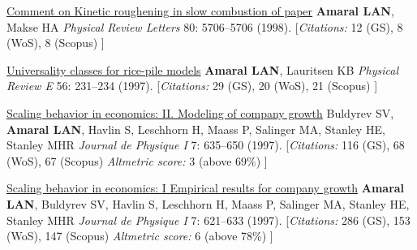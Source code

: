 \NumberedItem{\makebox[0.8cm][r]{[15]}}
\href{/people/amaral/comment-on-kinetic-roughening-in-slow-combustion-of-paper}
{Comment on Kinetic roughening in slow combustion of paper}
\newline
{\textbf{Amaral LAN}}, Makse HA
\newline
\textit{Physical Review Letters}
    80:
5706--5706 (1998).
    \newline
    \hfill [{\em{Citations:}} 12 (GS),
    8 (WoS), 8 (Scopus)
    ]
\newline
\Gap
~
\Gap

\NumberedItem{\makebox[0.8cm][r]{[14]}}
\href{/people/amaral/universality-classes-for-rice-pile-models}
{Universality classes for rice-pile models}
\newline
{\textbf{Amaral LAN}}, Lauritsen KB
\newline
\textit{Physical Review E}
    56:
231--234 (1997).
    \newline
    \hfill [{\em{Citations:}} 29 (GS),
    20 (WoS), 21 (Scopus)
    ]
\newline
\Gap
~
\Gap

\NumberedItem{\makebox[0.8cm][r]{[13]}}
\href{/people/amaral/scaling-behavior-in-economics-2-modeling-of-company-growth}
{Scaling behavior in economics: II. Modeling of company growth}
\newline
Buldyrev SV, {\textbf{Amaral LAN}}, Havlin S, Leschhorn H, Maass P, Salinger MA, Stanley HE, Stanley MHR
\newline
\textit{Journal de Physique I}
    7:
635--650 (1997).
    \newline
    \hfill [{\em{Citations:}} 116 (GS),
    68 (WoS), 67 (Scopus)
        {\hspace*{1cm} \em{Altmetric score:}}  3 (above 69\%)
    ]
\newline
\Gap
~
\Gap

\NumberedItem{\makebox[0.8cm][r]{[12]}}
\href{/people/amaral/scaling-behavior-in-economics-1-empirical-results-for-company-growth}
{Scaling behavior in economics: I Empirical results for company growth}
\newline
{\textbf{Amaral LAN}}, Buldyrev SV, Havlin S, Leschhorn H, Maass P, Salinger MA, Stanley HE, Stanley MHR
\newline
\textit{Journal de Physique I}
    7:
621--633 (1997).
    \newline
    \hfill [{\em{Citations:}} 286 (GS),
    153 (WoS), 147 (Scopus)
        {\hspace*{1cm} \em{Altmetric score:}}  6 (above 78\%)
    ]
\newline
\Gap
~
\Gap

